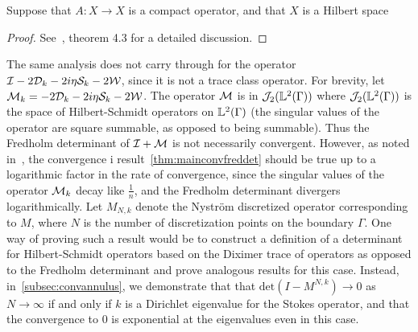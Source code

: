 \begin{thrm}
\label{thm:mainconvfreddet}
Suppose that $A:X \to X$ is a compact operator, and that $X$ is a
Hilbert space
\end{thrm}

\begin{proof}
See~\cite{zhao2015robust}, theorem 4.3 for a detailed discussion. 
\end{proof}

\begin{remark}
The same analysis does not carry through for the operator
$\mathcal I - 2 {\mathcal D}_{k} - 2i\eta {\mathcal S}_{k} - 2{\mathcal W}$, 
since it is not a trace class operator.
For brevity, let ${\mathcal M}_{k} = -2{\mathcal D}_{k} - 2i\eta {\mathcal S}_{k} - 2{\mathcal W}$.
The operator ${\mathcal M}$ is in ${\mathcal J}_{2}({\mathbb L}^{2}(\Gamma))$ where
${\mathcal J}_{2}({\mathbb L}^{2}(\Gamma))$ is the space of Hilbert-Schmidt operators
on ${\mathbb L}^{2}(\Gamma)$ (the singular values of the operator are square
summable, as opposed to being summable).
Thus the Fredholm determinant of $\mathcal I + {\mathcal M}$
is not necessarily convergent. 
However, as noted in~\cite{zhao2015robust}, the convergence i
result~\cref{thm:mainconvfreddet}
should be true up to a logarithmic factor in the rate
of convergence, since the singular values of the operator
${\mathcal M}_{k}$ decay like $\frac{1}{n}$, and the
Fredholm determinant divergers logarithmically. 
Let $M_{N,k}$ denote the Nystr\"{o}m discretized operator 
corresponding to $M$, where $N$ is the number of discretization points
on the boundary $\Gamma$.
One way of proving such a result would be to construct a definition 
of a determinant for Hilbert-Schmidt operators based on the 
Diximer trace of operators as opposed to the Fredholm determinant
and prove analogous results for this case.
Instead, in~\cref{subsec:convannulus}, we demonstrate that
that $\text{det} (I - M^{N,k}) \to 0$ as $N \to \infty$ if and only 
if $k$ is a Dirichlet eigenvalue for the Stokes operator, and that
the convergence to $0$ is exponential at the eigenvalues even in 
this case.
\end{remark}
